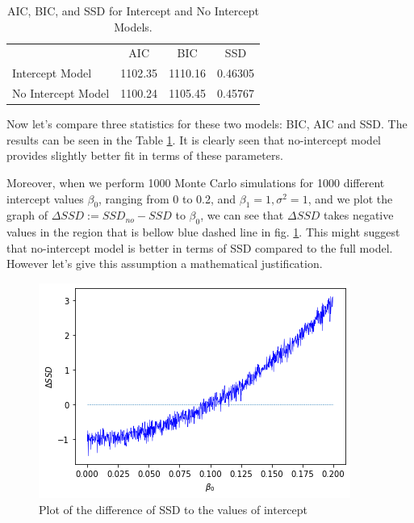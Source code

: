 \documentclass[12pt,a4paper,oneside]{book} %
\begin{document}
\begin{table}
	\centering
	\begin{tabular}{lccc} 
		& AIC & BIC & SSD \\
		Intercept Model & 1102.35 & 1110.16 & 0.46305 \\
		No Intercept Model & 1100.24 & 1105.45 & 0.45767 \\
	\end{tabular}
	\caption{AIC, BIC, and SSD for Intercept and No Intercept Models.}
	\label{tab:model_comparison}
\end{table}

Now let's compare three statistics for these two models: BIC, AIC and SSD. The results can be seen in the Table \ref{tab:model_comparison}. It is clearly seen that no-intercept model provides slightly better fit in terms of these parameters.

Moreover, when we perform 1000 Monte Carlo simulations for 1000 different intercept values $\beta_0$, ranging from 0 to 0.2, and $\beta_1=1, \sigma^2=1$, and we plot the graph of $\Delta SSD := SSD_{no}-SSD$ to $\beta_0$, we can see that $\Delta SSD$ takes negative values in the region that is bellow blue dashed line in fig. \ref{fig:ssd_to_intercept}. This might suggest that no-intercept model is better in terms of SSD compared to the full model. However let's give this assumption a mathematical justification.

\begin{figure}
	\centering
	\includegraphics[width=\linewidth]{delta_ssd_to_intercept.png}
	\caption{Plot of the difference of SSD to the values of intercept}
	\label{fig:ssd_to_intercept}
\end{figure}%
\end{document}
